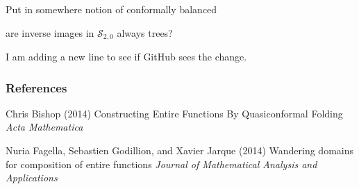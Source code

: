 \documentclass{beamer}
\begin{document}
\begin{frame}

\end{frame}











\begin{frame}

Put in somewhere notion of {\color{red} conformally balanced}

are inverse images in $\mathcal{S}_{2,0}$ always trees?

I am adding a new line to see if GitHub sees the change.

\end{frame}








\begin{frame}
\frametitle{References}
\footnotesize{
\begin{thebibliography}{99} %
  Chris Bishop (2014)
\newblock Constructing Entire Functions By Quasiconformal Folding
\newblock \emph{Acta Mathematica}

 Nuria Fagella, Sebastien Godillion, and Xavier Jarque (2014)
\newblock Wandering domains for composition of entire functions
\newblock \emph{Journal of Mathematical Analysis and Applications} 


\end{thebibliography}
}
\end{frame}


\end{document}
